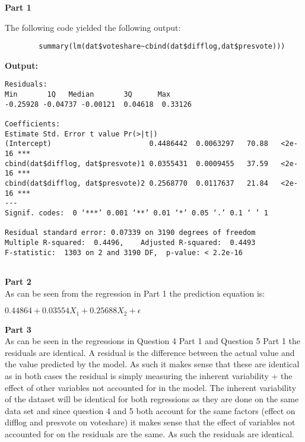 \documentclass{article}
\begin{document}
	\noindent\textbf{\large Part 1\\}
	
	The following code yielded the following output:\\
	\begin{verbatim}
		summary(lm(dat$voteshare~cbind(dat$difflog,dat$presvote)))
	\end{verbatim}
	\textbf{Output:}
	\begin{verbatim}
Residuals:
Min       1Q   Median       3Q      Max 
-0.25928 -0.04737 -0.00121  0.04618  0.33126 

Coefficients:
Estimate Std. Error t value Pr(>|t|)    
(Intercept)                       0.4486442  0.0063297   70.88   <2e-16 ***
cbind(dat$difflog, dat$presvote)1 0.0355431  0.0009455   37.59   <2e-16 ***
cbind(dat$difflog, dat$presvote)2 0.2568770  0.0117637   21.84   <2e-16 ***
---
Signif. codes:  0 ‘***’ 0.001 ‘**’ 0.01 ‘*’ 0.05 ‘.’ 0.1 ‘ ’ 1

Residual standard error: 0.07339 on 3190 degrees of freedom
Multiple R-squared:  0.4496,	Adjusted R-squared:  0.4493 
F-statistic:  1303 on 2 and 3190 DF,  p-value: < 2.2e-16
	
	\end{verbatim}
	
	\textbf{\large Part 2\\}
	As can be seen from the regression in Part 1 the prediction equation is:
	\begin{center}
		$ 0.44864 + 0.03554X_{1} + 0.25688X_{2} + \epsilon $
	\end{center} 


\textbf{\large Part 3\\}
As can be seen in the regressions in Question 4 Part 1 and Question 5 Part 1 the residuals are identical. A residual is the difference between the actual value and the value predicted by the model. As such it makes sense that these are identical as in both cases the residual is simply measuring the inherent variability + the effect of other variables not accounted for in the model. The inherent variability of the dataset will be identical for both regressions as they are done on the same data set and since question 4 and 5 both account for the same factors (effect on difflog and presvote on voteshare) it makes sense that the effect of variables not accounted for on the residuals are the same. As such the residuals are identical.
	
	
	
	
	
	
	
	
	
	
	
	
	
	
	
	
	
	
	
	
	
	
	
	
	
	
	
	
	
\end{document}
